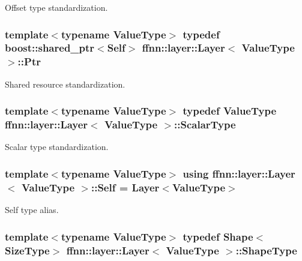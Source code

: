 Offset type standardization. 

\hypertarget{classffnn_1_1layer_1_1_layer_ac336e7cc01ccf0117c5a4a2baf98add4}{
\subsubsection[{Ptr}]{\setlength{\rightskip}{0pt plus 5cm}template$<$typename Value\-Type$>$ typedef boost\-::shared\-\_\-ptr$<${\bf Self}$>$ {\bf ffnn\-::layer\-::\-Layer}$<$ Value\-Type $>$\-::{\bf Ptr}}}\label{classffnn_1_1layer_1_1_layer_ac336e7cc01ccf0117c5a4a2baf98add4}


Shared resource standardization. 

\hypertarget{classffnn_1_1layer_1_1_layer_a3d482813f86f1ec69554b4592c478c32}{
\subsubsection[{Scalar\-Type}]{\setlength{\rightskip}{0pt plus 5cm}template$<$typename Value\-Type$>$ typedef Value\-Type {\bf ffnn\-::layer\-::\-Layer}$<$ Value\-Type $>$\-::{\bf Scalar\-Type}}}\label{classffnn_1_1layer_1_1_layer_a3d482813f86f1ec69554b4592c478c32}


Scalar type standardization. 

\hypertarget{classffnn_1_1layer_1_1_layer_a1d461b24632a849b2c26a5051a9cdbeb}{
\subsubsection[{Self}]{\setlength{\rightskip}{0pt plus 5cm}template$<$typename Value\-Type$>$ using {\bf ffnn\-::layer\-::\-Layer}$<$ Value\-Type $>$\-::{\bf Self} =  {\bf Layer}$<$Value\-Type$>$}}\label{classffnn_1_1layer_1_1_layer_a1d461b24632a849b2c26a5051a9cdbeb}


Self type alias. 

\hypertarget{classffnn_1_1layer_1_1_layer_ab80478345a2579402ae086a2f7de1ca2}{
\subsubsection[{Shape\-Type}]{\setlength{\rightskip}{0pt plus 5cm}template$<$typename Value\-Type$>$ typedef {\bf Shape}$<${\bf Size\-Type}$>$ {\bf ffnn\-::layer\-::\-Layer}$<$ Value\-Type $>$\-::{\bf Shape\-Type}}}\label{classffnn_1_1layer_1_1_layer_ab80478345a2579402ae086a2f7de1ca2}


